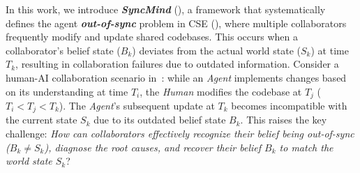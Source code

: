 % 

In this work, we introduce \textbf{\textit{SyncMind}} (), a framework that systematically defines the agent \textbf{\textit{out-of-sync}} problem in CSE (), where multiple collaborators frequently modify and update shared codebases.
% 
This occurs when a collaborator's belief state ($B_k$) deviates from the actual world state ($S_k$) at time $T_k$, resulting in collaboration failures due to outdated information.
Consider a human-AI collaboration scenario in~:
while an \textcolor{fig1_agent}{\textit{Agent}} implements changes based on its understanding at time $T_i$, the \textcolor{fig1_human}{\textit{Human}} modifies the codebase at $T_j$ ($T_i<T_j<T_k$). 
% 
The \textcolor{fig1_agent}{\textit{Agent}}'s subsequent update at $T_k$ becomes incompatible with the current state $S_k$ due to its outdated belief state $B_k$. 
% 
This raises the key challenge: \textit{How can collaborators effectively recognize their belief being \textit{out-of-sync} ($B_k \neq S_k$), diagnose the root causes, and recover their belief $B_k$ to match the world state $S_k$}? 




